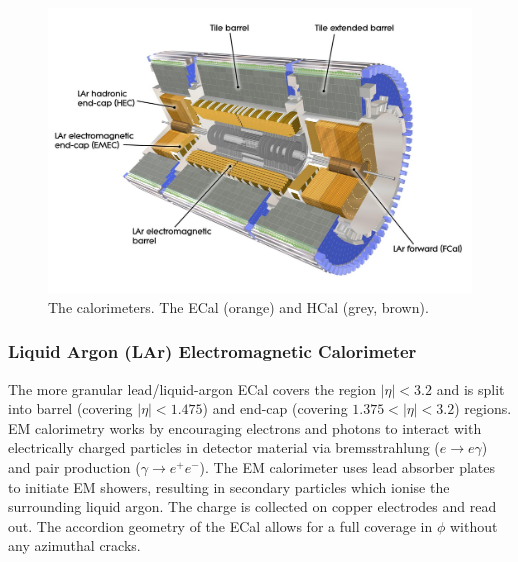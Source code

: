 


%
\begin{figure}[!htpb]
  \centering
  \includegraphics[width=0.8\linewidth]{chapters/2.detector/figs/atlas_calos.jpg}
  \caption{The \ATLAS calorimeters. The ECal (orange) and HCal (grey, brown).}
  \label{fig:atlas_calos}
\end{figure}
%


\subsubsection{Liquid Argon (LAr) Electromagnetic Calorimeter}
The more granular lead/liquid-argon ECal covers the region $|\eta|< 3.2$ and is split into barrel (covering $|\eta| < 1.475$) and end-cap (covering $1.375 < |\eta| < 3.2$) regions.
EM calorimetry works by encouraging electrons and photons to interact with electrically charged particles in detector material via bremsstrahlung ($e \rightarrow e\gamma$) and pair production ($\gamma \rightarrow e^+ e^- $).
The EM calorimeter uses lead absorber plates to initiate EM showers, resulting in secondary particles which ionise the surrounding liquid argon.
The charge is collected on copper electrodes and read out.
The accordion geometry of the ECal allows for a full coverage in $\phi$ without any azimuthal cracks. 

